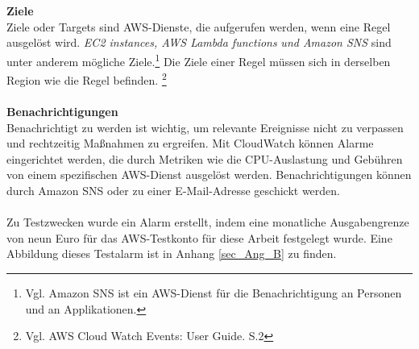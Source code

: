 \\\\
\textbf{Ziele} \\
Ziele oder Targets sind AWS-Dienste, die aufgerufen werden, wenn eine Regel ausgelöst wird.
\textit{EC2 instances, AWS Lambda functions} \textit{und Amazon SNS} sind unter anderem mögliche Ziele.\footnote{Vgl. Amazon SNS ist ein AWS-Dienst für die Benachrichtigung an Personen und an Applikationen.\cite{AMZ30}}
Die Ziele einer Regel müssen sich in derselben Region wie die Regel befinden.
\footnote{Vgl. AWS Cloud Watch Events: User Guide. S.2\cite{AMZ13}}
\\\\
\textbf{Benachrichtigungen}\\
Benachrichtigt zu werden ist wichtig, um relevante Ereignisse nicht zu verpassen und rechtzeitig Maßnahmen zu ergreifen. Mit CloudWatch können Alarme eingerichtet werden, die durch Metriken wie die CPU-Auslastung und Gebühren von einem spezifischen AWS-Dienst ausgelöst werden. Benachrichtigungen können durch Amazon SNS oder zu einer E-Mail-Adresse geschickt werden.
\\\\
Zu Testzwecken wurde ein Alarm erstellt, indem eine monatliche Ausgabengrenze von neun Euro für das AWS-Testkonto für diese Arbeit festgelegt wurde. Eine Abbildung dieses Testalarm ist in Anhang \ref{sec_Ang_B} zu finden.
